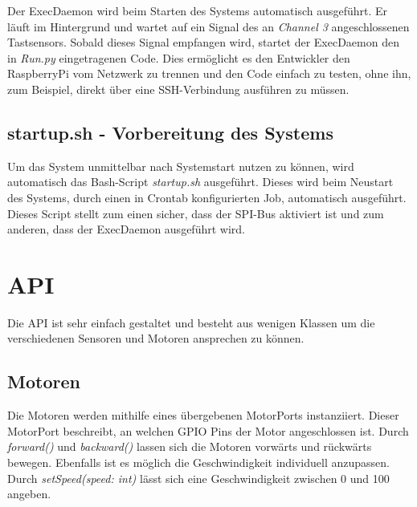 Der ExecDaemon wird beim Starten des Systems automatisch ausgeführt. Er läuft im Hintergrund und wartet auf ein Signal des an \emph{Channel 3} angeschlossenen Tastsensors. Sobald dieses Signal empfangen wird, startet der ExecDaemon den in \emph{Run.py} eingetragenen Code. Dies ermöglicht es den Entwickler den RaspberryPi vom Netzwerk zu trennen und den Code einfach zu testen, ohne ihn, zum Beispiel, direkt über eine SSH-Verbindung ausführen zu müssen.

\subsection{startup.sh - Vorbereitung des Systems}

Um das System unmittelbar nach Systemstart nutzen zu können, wird automatisch das Bash-Script \emph{startup.sh} ausgeführt. Dieses wird beim Neustart des Systems, durch einen in Crontab konfigurierten Job, automatisch ausgeführt. Dieses Script stellt zum einen sicher, dass der SPI-Bus aktiviert ist und zum anderen, dass der ExecDaemon ausgeführt wird.

\section{API}

Die API ist sehr einfach gestaltet und besteht aus wenigen Klassen um die verschiedenen Sensoren und Motoren ansprechen zu können. 


\clearpage %

\subsection{Motoren}
Die Motoren werden mithilfe eines übergebenen MotorPorts instanziiert. Dieser MotorPort beschreibt, an welchen GPIO Pins der Motor angeschlossen ist. Durch \emph{forward()} und \emph{backward()} lassen sich die Motoren vorwärts und rückwärts bewegen. Ebenfalls ist es möglich die Geschwindigkeit individuell anzupassen. Durch \emph{setSpeed(speed: int)} lässt sich eine Geschwindigkeit zwischen 0 und 100 angeben. 

